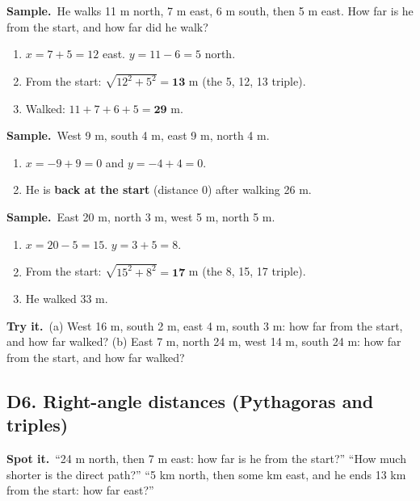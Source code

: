 \documentclass[11pt,a4paper]{article}
\let\oldsubsection\subsection
\renewcommand{\subsection}{\needspace{9\baselineskip}\oldsubsection}
\newcommand{\spot}{\textbf{\color{ember}Spot it.}\ }
\newif\ifkeepsamp
\newcommand{\samp}{\ifkeepsamp\needspace{4\baselineskip}\fi\textbf{\color{ember}Sample.}\ }
\newcommand{\tryit}[1]{\textbf{\color{ember}Try it.}\ #1}
\begin{document}
\samp He walks 11 m north, 7 m east, 6 m south, then 5 m east. How far is he from the start, and how far did he walk?
\begin{enumerate}
\item $x = 7 + 5 = 12$ east. $y = 11 - 6 = 5$ north.
\item From the start: $\sqrt{12^2 + 5^2} = \mathbf{13}$ m (the 5, 12, 13 triple).
\item Walked: $11 + 7 + 6 + 5 = \mathbf{29}$ m.
\end{enumerate}
\samp West 9 m, south 4 m, east 9 m, north 4 m.
\begin{enumerate}
\item $x = -9 + 9 = 0$ and $y = -4 + 4 = 0$.
\item He is \textbf{back at the start} (distance 0) after walking 26 m.
\end{enumerate}
\samp East 20 m, north 3 m, west 5 m, north 5 m.
\begin{enumerate}
\item $x = 20 - 5 = 15$. $y = 3 + 5 = 8$.
\item From the start: $\sqrt{15^2 + 8^2} = \mathbf{17}$ m (the 8, 15, 17 triple).
\item He walked 33 m.
\end{enumerate}

\tryit (a) West 16 m, south 2 m, east 4 m, south 3 m: how far from the start, and how far walked? (b) East 7 m, north 24 m, west 14 m, south 24 m: how far from the start, and how far walked?

\subsection{D6. Right-angle distances (Pythagoras and triples)}
\spot ``24 m north, then 7 m east: how far is he from the start?'' ``How much shorter is the direct path?'' ``5 km north, then some km east, and he ends 13 km from the start: how far east?''
\end{document}
